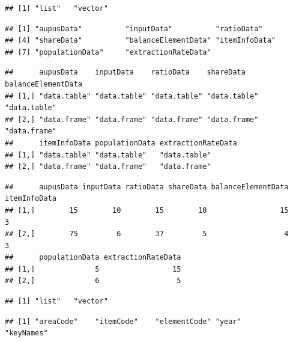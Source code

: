 \documentclass[nojss]{jss}
\begin{document}
\begin{knitrout}
\color{fgcolor}\begin{kframe}
\begin{alltt}
\end{alltt}
\begin{verbatim}
## [1] "list"   "vector"
\end{verbatim}
\begin{alltt}
\end{alltt}
\begin{verbatim}
## [1] "aupusData"          "inputData"          "ratioData"         
## [4] "shareData"          "balanceElementData" "itemInfoData"      
## [7] "populationData"     "extractionRateData"
\end{verbatim}
\begin{alltt}
\end{alltt}
\begin{verbatim}
##      aupusData    inputData    ratioData    shareData    balanceElementData
## [1,] "data.table" "data.table" "data.table" "data.table" "data.table"      
## [2,] "data.frame" "data.frame" "data.frame" "data.frame" "data.frame"      
##      itemInfoData populationData extractionRateData
## [1,] "data.table" "data.table"   "data.table"      
## [2,] "data.frame" "data.frame"   "data.frame"
\end{verbatim}
\begin{alltt}
\end{alltt}
\begin{verbatim}
##      aupusData inputData ratioData shareData balanceElementData itemInfoData
## [1,]        15        10        15        10                 15            3
## [2,]        75         6        37         5                  4            3
##      populationData extractionRateData
## [1,]              5                 15
## [2,]              6                  5
\end{verbatim}
\begin{alltt}
\end{alltt}
\begin{verbatim}
## [1] "list"   "vector"
\end{verbatim}
\begin{alltt}
\end{alltt}
\begin{verbatim}
## [1] "areaCode"    "itemCode"    "elementCode" "year"        "keyNames"
\end{verbatim}
\end{kframe}
\end{knitrout}
\end{document}
